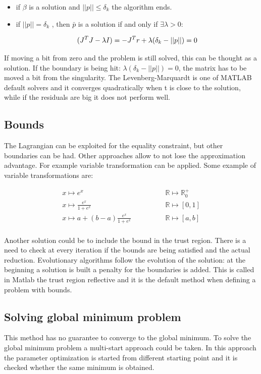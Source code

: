 \begin{multicols}{2}
  \begin{itemize}
    \item if $\beta$ is a solution and $||p||\leq\delta_k$ the algorithm ends.
    \item if $||p||=\delta_k$ , then $\bar{p}$ is a solution if and only if
      $\exists \lambda > 0$:

      $$(J^TJ-\lambda I)=-J^Tr \\ + \lambda(\delta_k-||p||)=0$$
  \end{itemize}
\end{multicols}
\noindent

If moving a bit from zero and the problem is still solved, this can be thought as a solution.
If the boundary is being hit: $\lambda(\delta_k-||p||)=0$, the matrix has to be moved a bit from the singularity.
The Levenberg-Marquardt is one of MATLAB default solvers and it converges quadratically when t is close to the solution, while if the residuals are big it does not perform well.

  \subsection{Bounds}
  The Lagrangian can be exploited for the equality constraint, but other boundaries can be had.
  Other approaches allow to not lose the approximation advantage.
  For example variable transformation can be applied.
  Some example of variable transformations are:

  \begin{align*}
    x \mapsto e^x\qquad&\qquad  \mathbb{R} \mapsto \mathbb{R}_0^+\\
    x \mapsto \frac{e^x}{1+e^x}\qquad&\qquad  \mathbb{R} \mapsto [0,1]\\
    x \mapsto a + (b-a)\frac{e^x}{1+e^x}\qquad&\qquad  \mathbb{R} \mapsto [a,b]\\
  \end{align*}

  Another solution could be to include the bound in the trust region.
  There is a need to check at every iteration if the bounds are being satisfied and the actual reduction.
  Evolutionary algorithms follow the evolution of the solution: at the beginning a solution is built a penalty for the boundaries is added.
  This is called in Matlab the trust region reflective and it is the default method when defining a problem with bounds.

  \subsection{Solving global minimum problem}
  This method has no guarantee to converge to the global minimum.
  To solve the global minimum problem a multi-start approach could be taken.
  In this approach the parameter optimization is started from different starting point and it is checked whether the same minimum is obtained.

